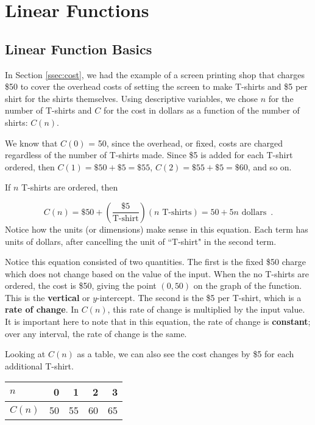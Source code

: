 \section{Linear Functions}
\label{sec:linear}


\subsection{Linear Function Basics}

In Section \ref{ssec:cost}, we had the example of a screen printing shop that charges \$50 to cover the overhead costs of setting the screen to make T-shirts and \$5 per shirt for the shirts themselves. Using descriptive variables, we chose $n$ for the number of T-shirts and $C$ for the cost in dollars as a function of the number of shirts: $C(n)$.

We know that $C(0)$ = 50, since the overhead, or fixed, costs are charged regardless of the number of T-shirts made. Since \$5 is added for each T-shirt ordered, then $C(1) = \$50 + \$5 = \$55$, $C(2) = \$55 + \$5 = \$60$, and so on.

If $n$ T-shirts are ordered, then

$$C(n) = \$50 + \left(\frac{\$5}{\mbox{T-shirt}}\right)(n \mbox{ T-shirts}) = 50 + 5n \mbox{ dollars} \enspace .$$
Notice how the units (or dimensions) make sense in this equation. Each term has units of dollars, after cancelling the unit of ``T-shirt" in the second term.

Notice this equation consisted of two quantities. The first is the fixed \$50 charge which does not change based on the value of the input. When the no T-shirts are ordered, the cost is \$50, giving the point
$(0, 50)$ on the graph of the function. This is the {\bf vertical} or {$y$-intercept}. The second is the \$5 per T-shirt, which is a \textbf{rate of change}. In $C(n)$, this rate of change is multiplied by the input value. It is important here to note that in this equation, the rate of change is {\bf constant}; over any interval, the rate of change is the same.

Looking at $C(n)$ as a table, we can also see the cost changes by \$5 for each additional T-shirt.

\begin{longtable}[]{@{}lrrrr@{}}
\toprule
$n$ & 0 & 1 & 2 & 3\tabularnewline
\midrule
$C(n)$ & 50 & 55 & 60 & 65\tabularnewline
\bottomrule
\end{longtable}

